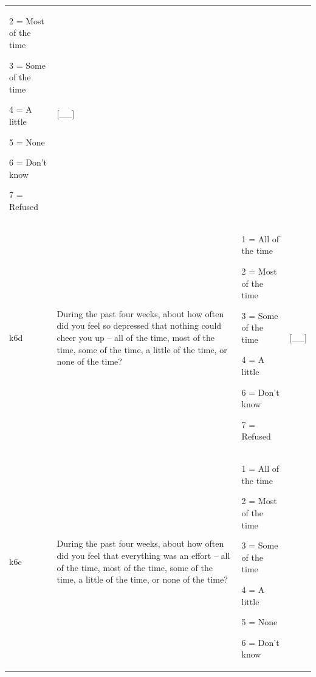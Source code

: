 \documentclass[12pt,a4paper]{book}
\theoremstyle{definition}
\theoremstyle{definition}
\theoremstyle{definition}
\theoremstyle{remark}
\begin{document}
\begin{longtable}[]{@{}llll@{}}
\begin{minipage}[t]{0.24\columnwidth}
2 = Most of the time

3 = Some of the time

4 = A little

5 = None

6 = Don't know

7 = Refused\strut
\end{minipage} & \begin{minipage}[t]{0.24\columnwidth}\raggedright
{[}\_\_{]}\strut
\end{minipage}\tabularnewline
\begin{minipage}[t]{0.24\columnwidth}\raggedright
k6d\strut
\end{minipage} & \begin{minipage}[t]{0.24\columnwidth}\raggedright
During the past four weeks, about how often did you feel so depressed
that nothing could cheer you up -- all of the time, most of the time,
some of the time, a little of the time, or none of the time?\strut
\end{minipage} & \begin{minipage}[t]{0.24\columnwidth}\raggedright
1 = All of the time

2 = Most of the time

3 = Some of the time

4 = A little

6 = Don't know

7 = Refused\strut
\end{minipage} & \begin{minipage}[t]{0.24\columnwidth}\raggedright
{[}\_\_{]}\strut
\end{minipage}\tabularnewline
\begin{minipage}[t]{0.24\columnwidth}\raggedright
k6e\strut
\end{minipage} & \begin{minipage}[t]{0.24\columnwidth}\raggedright
During the past four weeks, about how often did you feel that everything
was an effort -- all of the time, most of the time, some of the time, a
little of the time, or none of the time?\strut
\end{minipage} & \begin{minipage}[t]{0.24\columnwidth}\raggedright
1 = All of the time

2 = Most of the time

3 = Some of the time

4 = A little

5 = None

6 = Don't know


\end{minipage}
\end{longtable}
\end{document}
